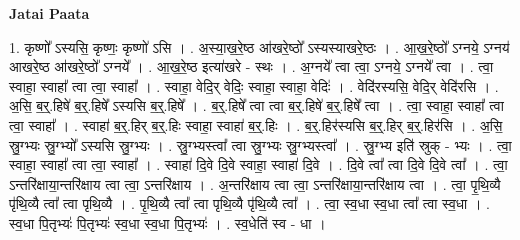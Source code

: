 \documentclass[17pt]{extarticle}
\begin{document}
\textbf{Jatai Paata} \newline

1. कृष्णो᳚ ऽस्यसि॒ कृष्णः॒ कृष्णो॑ ऽसि । . अ॒स्या॒ख॒रे॒ष्ठ आ॑खरे॒ष्ठो᳚ ऽस्यस्याखरे॒ष्ठः । . आ॒ख॒रे॒ष्ठो᳚ ऽग्नये॒ ऽग्नय॑ आखरे॒ष्ठ आ॑खरे॒ष्ठो᳚ ऽग्नये᳚ । . आ॒ख॒रे॒ष्ठ इत्या॑खरे - स्थः । . अ॒ग्नये᳚ त्वा त्वा॒ ऽग्नये॒ ऽग्नये᳚ त्वा । . त्वा॒ स्वाहा॒ स्वाहा᳚ त्वा त्वा॒ स्वाहा᳚ । . स्वाहा॒ वेदि॒र् वेदिः॒ स्वाहा॒ स्वाहा॒ वेदिः॑ । . वेदि॑रस्यसि॒ वेदि॒र् वेदि॑रसि । . अ॒सि॒ ब॒र्॒.हिषे॑ ब॒र्॒.हिषे᳚ ऽस्यसि ब॒र्॒.हिषे᳚ । . ब॒र्॒.हिषे᳚ त्वा त्वा ब॒र्॒.हिषे॑ ब॒र्॒.हिषे᳚ त्वा । . त्वा॒ स्वाहा॒ स्वाहा᳚ त्वा त्वा॒ स्वाहा᳚ । . स्वाहा॑ ब॒र्॒.हिर् ब॒र्॒.हिः स्वाहा॒ स्वाहा॑ ब॒र्॒.हिः । . ब॒र्॒.हिर॑स्यसि ब॒र्॒.हिर् ब॒र्॒.हिर॑सि । . अ॒सि॒ स्रु॒ग्भ्यः स्रु॒ग्भ्यो᳚ ऽस्यसि स्रु॒ग्भ्यः । . स्रु॒ग्भ्यस्त्वा᳚ त्वा स्रु॒ग्भ्यः स्रु॒ग्भ्यस्त्वा᳚ । . स्रु॒ग्भ्य इति॑ स्रुक् - भ्यः । . त्वा॒ स्वाहा॒ स्वाहा᳚ त्वा त्वा॒ स्वाहा᳚ । . स्वाहा॑ दि॒वे दि॒वे स्वाहा॒ स्वाहा॑ दि॒वे । . दि॒वे त्वा᳚ त्वा दि॒वे दि॒वे त्वा᳚ । . त्वा॒ ऽन्तरि॑क्षाया॒न्तरि॑क्षाय त्वा त्वा॒ ऽन्तरि॑क्षाय । . अ॒न्तरि॑क्षाय त्वा त्वा॒ ऽन्तरि॑क्षाया॒न्तरि॑क्षाय त्वा । . त्वा॒ पृ॒थि॒व्यै पृ॑थि॒व्यै त्वा᳚ त्वा पृथि॒व्यै । . पृ॒थि॒व्यै त्वा᳚ त्वा पृथि॒व्यै पृ॑थि॒व्यै त्वा᳚ । . त्वा॒ स्व॒धा स्व॒धा त्वा᳚ त्वा स्व॒धा । . स्व॒धा पि॒तृभ्यः॑ पि॒तृभ्यः॑ स्व॒धा स्व॒धा पि॒तृभ्यः॑ । . स्व॒धेति॑ स्व - धा । \newline
\end{document}
